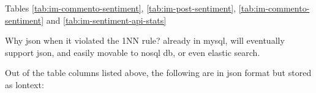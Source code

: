 Tables \ref{tab:im-commento-sentiment}, \ref{tab:im-post-sentiment}, \ref{tab:im-commento-sentiment} and \ref{tab:im-sentiment-api-stats}  

Why json when it violated the 1NN rule? already in mysql, will eventually support json, and easily movable to nosql db, or even elastic search. 

Out of the table columns listed above, the following are in json format but stored as lontext:





